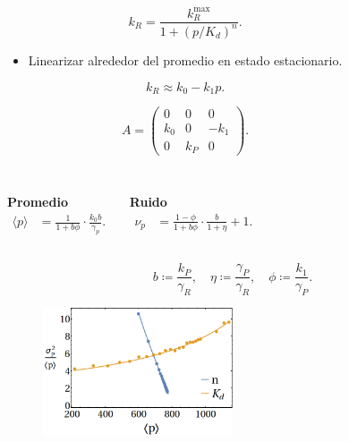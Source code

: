 \documentclass[xcolor=dvipsnames]{beamer}
\begin{document}
\begin{frame}
\begin{columns}[c]
\begin{itemize}
\begin{equation*}
k_R = \frac{k_R^{\text{max}}}{1+(p/K_d)^n}.
\end{equation*}

\item Linearizar alrededor del promedio en estado estacionario.

\begin{equation*}
k_R \approx k_0-k_1p.
\end{equation*}

\vspace{-1mm}
\begin{equation*}

A = 
\begin{pmatrix}
0 & 0 & 0 \\
k_0 & 0 & -k_1 \\
0 & k_P & 0
\end{pmatrix}.
\end{equation*}
\end{itemize}
\end{columns}
\end{frame}

\begin{frame}
\begin{columns}[c]

\vspace{3mm}


\centering \textbf{Promedio}
\begin{align*}
\langle p \rangle &= \frac{1}{1+b\phi} \cdot \frac{k_0b}{\gamma_p}.
\end{align*}

\centering \textbf{Ruido}
\begin{align*}
\nu_p &= \frac{1-\phi}{1+b\phi} \cdot \frac{b}{1+\eta}+1.
\end{align*}
\end{columns}

\vspace{3 mm}

\begin{equation*}
  b \coloneqq \frac{k_P}{\gamma_R}, \quad \eta \coloneqq \frac{\gamma_P}{\gamma_R}, \quad \phi \coloneqq \frac{k_1}{\gamma_P}.
\end{equation*}

\begin{figure}[p]
    \centering
    \includegraphics[width=0.5\textwidth]{Pmas-autorreg_analytic_solver}
\end{figure}

\end{frame}
\end{document}

